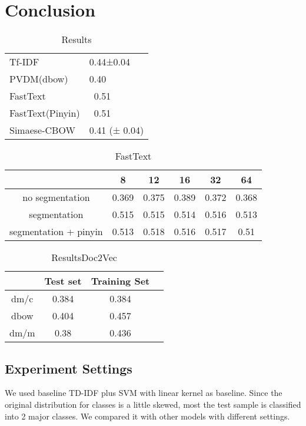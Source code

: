 \chapter{Conclusion}

\begin{table}[]
\centering
\caption{Results}
\label{resultAll}
\begin{tabular}{ll}
Tf-IDF   & 0.44±0.04 \\
PVDM(dbow) & 0.40    \\
FastText &  ~0.51   \\
FastText(Pinyin) &  ~0.51  \\
Simaese-CBOW & 0.41 (± 0.04)
\end{tabular}
\end{table}

\begin{table}[]
\centering
\caption{FastText}
\label{fasttext}
\begin{tabular}{|c|c|c|c|c|c|}
\hline
   & 8 & 12 & 16 & 32 & 64 \\
\hline
no segmentation  & 0.369 & 0.375 & 0.389 & 0.372 & 0.368 \\
segmentation  & 0.515 & 0.515 & 0.514 & 0.516 & 0.513 \\
segmentation + pinyin  & 0.513 & 0.518 & 0.516 & 0.517 & 0.51 \\
\hline
\end{tabular}
\end{table}

\begin{table}[]
\centering
\caption{ResultsDoc2Vec}
\label{resultAll}
\begin{tabular}{|c|c|c|c|}
\hline
      & Test set & Training Set \\
\hline
dm/c  & 0.384 &  0.384 \\
dbow &  0.404  & 0.457 \\
dm/m &  0.38  & 0.436
\end{tabular}
\end{table}


\section{Experiment Settings}


We used baseline TD-IDF plus SVM with linear kernel as baseline. Since the original distribution for classes is a little skewed, most the test sample is classified into 2 major classes.
We compared it with other models with different settings. \\

